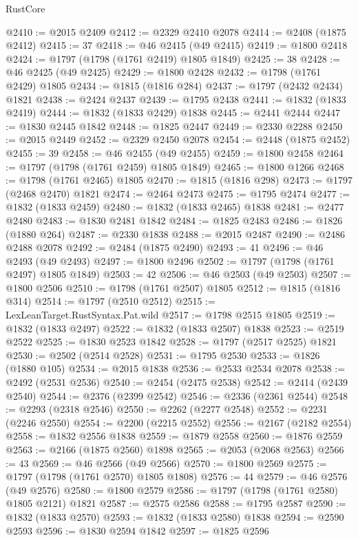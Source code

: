 \begin{lexlean}{RustCore}
\begin{coremodule}
@2410 := @2015 @2409
@2412 := @2329 @2410 @2078
@2414 := @2408 (@1875 @2412)
@2415 := 37
@2418 := @46 @2415 (@49 @2415)
@2419 := @1800 @2418
@2424 := @1797 (@1798 (@1761 @2419) @1805 @1849)
@2425 := 38
@2428 := @46 @2425 (@49 @2425)
@2429 := @1800 @2428
@2432 := @1798 (@1761 @2429) @1805
@2434 := @1815 (@1816 @284)
@2437 := @1797 (@2432 @2434) @1821
@2438 := @2424 @2437
@2439 := @1795 @2438
@2441 := @1832 (@1833 @2419)
@2444 := @1832 (@1833 @2429) @1838
@2445 := @2441 @2444
@2447 := @1830 @2445 @1842
@2448 := @1825 @2447
@2449 := @2330 @2288
@2450 := @2015 @2449
@2452 := @2329 @2450 @2078
@2454 := @2448 (@1875 @2452)
@2455 := 39
@2458 := @46 @2455 (@49 @2455)
@2459 := @1800 @2458
@2464 := @1797 (@1798 (@1761 @2459) @1805 @1849)
@2465 := @1800 @1266
@2468 := @1798 (@1761 @2465) @1805
@2470 := @1815 (@1816 @298)
@2473 := @1797 (@2468 @2470) @1821
@2474 := @2464 @2473
@2475 := @1795 @2474
@2477 := @1832 (@1833 @2459)
@2480 := @1832 (@1833 @2465) @1838
@2481 := @2477 @2480
@2483 := @1830 @2481 @1842
@2484 := @1825 @2483
@2486 := @1826 (@1880 @264)
@2487 := @2330 @1838
@2488 := @2015 @2487
@2490 := @2486 @2488 @2078
@2492 := @2484 (@1875 @2490)
@2493 := 41
@2496 := @46 @2493 (@49 @2493)
@2497 := @1800 @2496
@2502 := @1797 (@1798 (@1761 @2497) @1805 @1849)
@2503 := 42
@2506 := @46 @2503 (@49 @2503)
@2507 := @1800 @2506
@2510 := @1798 (@1761 @2507) @1805
@2512 := @1815 (@1816 @314)
@2514 := @1797 (@2510 @2512)
@2515 := LexLeanTarget.RustSyntax.Pat.wild
@2517 := @1798 @2515 @1805
@2519 := @1832 (@1833 @2497)
@2522 := @1832 (@1833 @2507) @1838
@2523 := @2519 @2522
@2525 := @1830 @2523 @1842
@2528 := @1797 (@2517 @2525) @1821
@2530 := @2502 (@2514 @2528)
@2531 := @1795 @2530
@2533 := @1826 (@1880 @105)
@2534 := @2015 @1838
@2536 := @2533 @2534 @2078
@2538 := @2492 (@2531 @2536)
@2540 := @2454 (@2475 @2538)
@2542 := @2414 (@2439 @2540)
@2544 := @2376 (@2399 @2542)
@2546 := @2336 (@2361 @2544)
@2548 := @2293 (@2318 @2546)
@2550 := @2262 (@2277 @2548)
@2552 := @2231 (@2246 @2550)
@2554 := @2200 (@2215 @2552)
@2556 := @2167 (@2182 @2554)
@2558 := @1832 @2556 @1838
@2559 := @1879 @2558
@2560 := @1876 @2559
@2563 := @2166 (@1875 @2560) @1898
@2565 := @2053 (@2068 @2563)
@2566 := 43
@2569 := @46 @2566 (@49 @2566)
@2570 := @1800 @2569
@2575 := @1797 (@1798 (@1761 @2570) @1805 @1808)
@2576 := 44
@2579 := @46 @2576 (@49 @2576)
@2580 := @1800 @2579
@2586 := @1797 (@1798 (@1761 @2580) @1805 @2121) @1821
@2587 := @2575 @2586
@2588 := @1795 @2587
@2590 := @1832 (@1833 @2570)
@2593 := @1832 (@1833 @2580) @1838
@2594 := @2590 @2593
@2596 := @1830 @2594 @1842
@2597 := @1825 @2596

\end{coremodule}
\end{lexlean}

